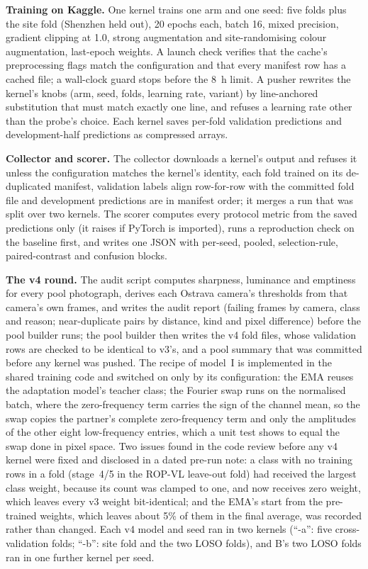 \textbf{Training on Kaggle.} One kernel trains one arm and one seed: five folds plus the site fold (Shenzhen held out), 20 epochs each, batch 16, mixed precision, gradient clipping at 1.0, strong augmentation and site-randomising colour augmentation, last-epoch weights. A launch check verifies that the cache's preprocessing flags match the configuration and that every manifest row has a cached file; a wall-clock guard stops before the 8~h limit. A pusher rewrites the kernel's knobs (arm, seed, folds, learning rate, variant) by line-anchored substitution that must match exactly one line, and refuses a learning rate other than the probe's choice. Each kernel saves per-fold validation predictions and development-half predictions as compressed arrays.

\textbf{Collector and scorer.} The collector downloads a kernel's output and refuses it unless the configuration matches the kernel's identity, each fold trained on its de-duplicated manifest, validation labels align row-for-row with the committed fold file and development predictions are in manifest order; it merges a run that was split over two kernels. The scorer computes every protocol metric from the saved predictions only (it raises if PyTorch is imported), runs a reproduction check on the baseline first, and writes one JSON with per-seed, pooled, selection-rule, paired-contrast and confusion blocks.

\textbf{The v4 round.} The audit script computes sharpness, luminance and emptiness for every pool photograph, derives each Ostrava camera's thresholds from that camera's own frames, and writes the audit report (failing frames by camera, class and reason; near-duplicate pairs by distance, kind and pixel difference) before the pool builder runs; the pool builder then writes the v4 fold files, whose validation rows are checked to be identical to v3's, and a pool summary that was committed before any kernel was pushed. The recipe of model~I is implemented in the shared training code and switched on only by its configuration: the EMA reuses the adaptation model's teacher class; the Fourier swap runs on the normalised batch, where the zero-frequency term carries the sign of the channel mean, so the swap copies the partner's complete zero-frequency term and only the amplitudes of the other eight low-frequency entries, which a unit test shows to equal the swap done in pixel space. Two issues found in the code review before any v4 kernel were fixed and disclosed in a dated pre-run note: a class with no training rows in a fold (stage~4/5 in the ROP-VL leave-out fold) had received the largest class weight, because its count was clamped to one, and now receives zero weight, which leaves every v3 weight bit-identical; and the EMA's start from the pre-trained weights, which leaves about 5\% of them in the final average, was recorded rather than changed. Each v4 model and seed ran in two kernels (``-a'': five cross-validation folds; ``-b'': site fold and the two LOSO folds), and B's two LOSO folds ran in one further kernel per seed.


